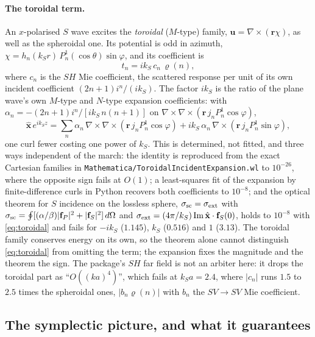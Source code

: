 \documentclass[11pt,a4paper]{article}
\newcommand{\bu}{\mathbf{u}}
\begin{document}
\paragraph{The toroidal term.}  An $x$-polarised $S$ wave excites the
\emph{toroidal} ($M$-type) family, $\bu=\nabla\times(\mathbf{r}\chi)$, as well as the
spheroidal one.  Its potential is odd in azimuth,
$\chi=h_n(k_Sr)\,P_n^1(\cos\theta)\sin\varphi$, and its coefficient is
\begin{equation}\label{eq:toroidal}
  t_n = i k_S\, c_n\, \varrho(n),
\end{equation}
where $c_n$ is the $SH$ Mie coefficient, the scattered response per unit of its
own incident coefficient $(2n+1)i^n/(ik_S)$.  The factor $ik_S$ is the ratio of
the plane wave's own $M$-type and $N$-type expansion coefficients: with
$\alpha_n=-(2n+1)i^n/[ik_S\,n(n+1)]$ on
$\nabla\times\nabla\times(\mathbf{r}\, j_nP_n^1\cos\varphi)$,
\[
  \hat{\mathbf{x}}\,e^{ik_Sz}=\sum_n \alpha_n\,\nabla\times\nabla\times(\mathbf{r}\,j_nP_n^1\cos\varphi)
  + ik_S\,\alpha_n\,\nabla\times(\mathbf{r}\,j_nP_n^1\sin\varphi),
\]
one curl fewer costing one power of $k_S$.  This is determined, not fitted, and
three ways independent of the march: the identity is reproduced from the exact
Cartesian families in \texttt{Mathematica/}\allowbreak\texttt{ToroidalIncidentExpansion.wl} to
$10^{-26}$, where the opposite sign fails at $O(1)$; a least-squares fit of the
expansion by finite-difference curls in Python recovers both coefficients to
$10^{-8}$; and the optical theorem for $S$ incidence on the lossless sphere,
$\sigma_{\rm sc}=\sigma_{\rm ext}$ with
$\sigma_{\rm sc}=\oint[(\alpha/\beta)|\mathbf{f}_P|^2+|\mathbf{f}_S|^2]\,d\Omega$ and
$\sigma_{\rm ext}=(4\pi/k_S)\,\mathrm{Im}\,\hat{\mathbf{x}}\cdot\mathbf{f}_S(0)$, holds to
$10^{-8}$ with \eqref{eq:toroidal} and fails for $-ik_S$ ($1.145$), $k_S$
($0.516$) and $1$ ($3.13$).  The toroidal family conserves energy on its own, so
the theorem alone cannot distinguish \eqref{eq:toroidal} from omitting the term;
the expansion fixes the magnitude and the theorem the sign.  The package's $SH$
far field is not an arbiter here: it drops the toroidal part as
``$O((ka)^4)$'', which fails at $k_Sa=2.4$, where $|c_n|$ runs $1.5$ to $2.5$
times the spheroidal ones, $|b_n\varrho(n)|$ with $b_n$ the $SV\to SV$ Mie coefficient.

\subsection{The symplectic picture, and what it
guarantees}\label{sec:symplectic}
\end{document}
